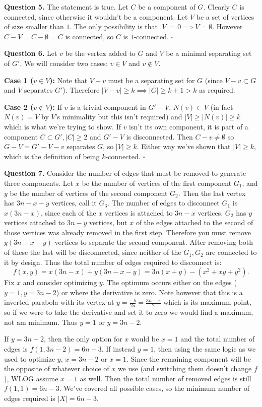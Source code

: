 \documentclass[letterpaper, reqno,11pt]{article}
\begin{document}
{\medskip\noindent\bf Question 5.} The statement is true. Let $C$ be a component of $G$. Clearly $C$ is connected, since otherwise it wouldn't be a component. Let $V$ be a set of vertices of size smaller than $1$. The only possibility is that $|V|=0\implies V=\emptyset$. However $C-V=C-\emptyset=C$ is connected, so $C$ is $1$-connected. $\square$

{\medskip\noindent\bf Question 6.} Let $v$ be the vertex added to $G$ and $V$ be a minimal separating set of $G'$. We will consider two cases: $v\in V$ and $v\not\in V$. 

{\noindent\bf Case 1 ($v\in V$):} Note that $V-v$ must be a separating set for $G$ (since $V-v\subset G$ and $V$ separates $G'$). Therefore $|V-v|\geq k\implies |G|\geq k+1>k$ as required. 

{\noindent\bf Case 2 ($v\not\in  V$):} If $v$ is a trivial component in $G'-V$, $N(v)\subset V$ (in fact $N(v)=V$ by $V$'s minimality but this isn't required) and $|V|\geq |N(v)|\geq k$ which is what we're trying to show. If $v$ isn't its own component, it is part of a component $C\subset G',|C|\geq 2$ and $G'-V$ is disconnected. Then $C-v\neq \emptyset$ so $G-V=G'-V-v$ separates $G$, so $|V|\geq k$. Either way we've shown that $|V|\geq k$, which is the definition of being $k$-connected. $\square$


{\medskip\noindent\bf Question 7.} Consider the number of edges that must be removed to generate three components. Let $x$ be the number of vertices of the first component $G_1$, and $y$ be the number of vertices of the second component $G_2$. Then the last vertex has $3n-x-y$ vertices, call it $G_3$. The number of edges to disconnect $G_1$ is $x(3n-x)$, since each of the $x$ vertices is attached to $3n-x$ vertices. $G_2$ has $y$ vertices attached to $3n-y$ vertices, but $x$ of the edges attached to the second of those vertices was already removed in the first step. Therefore you must remove $y(3n-x-y)$ vertices to separate the second component. After removing both of these the last will be disconnected, since neither of the $G_1,G_2$ are connected to it by design. Thus the total number of edges required to disconnect is: 
\[
f(x,y)=x(3n-x)+y(3n-x-y)=3n(x+y)-(x^2+xy+y^2)
.\]
Fix $x$ and consider optimizing $y$. The optimum occurs either on the edges ($y=1,y=3n-2$) or where the derivative is zero. Note however that this is a inverted parabola with its vertex at $y=\frac{-b}{2a}=\frac{3n-x}{2}$ which is its maximum point, so if we were to take the derivative and set it to zero we would find a maximum, not am minimum. Thus $y=1$ or $y=3n-2$. 

If $y=3n-2$, then the only option for $x$ would be $x=1$ and the total number of edges is $f(1,3n-2)=6n-3$. If instead $y=1$, then using the same logic as we used to optimize $y$, $x=3n-2$ or $x=1$. Since the remaining component will be the opposite of whatever choice of $x$ we use (and switching them doesn't change $f$), WLOG assume $x=1$ as well. Then the total number of removed edges is still $f(1,1)=6n-3$. We've covered all possible cases, so the minimum number of edges required is $|X|=6n-3$. 
\end{document}
